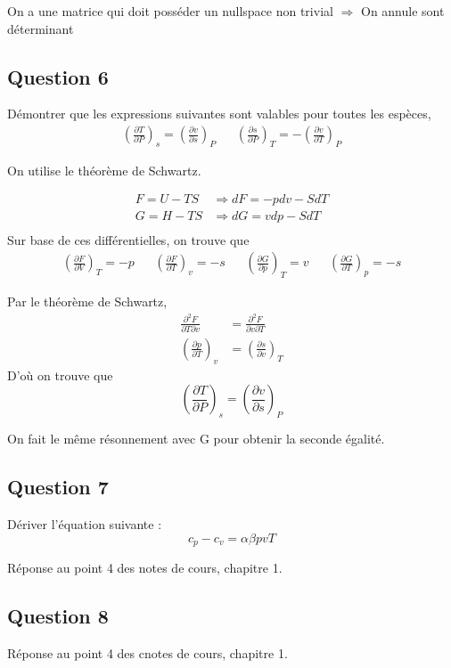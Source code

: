 \begin{tcolorbox}
    On a une matrice qui doit posséder un nullspace non trivial $\Rightarrow$ On annule sont déterminant
\end{tcolorbox}


\subsection*{Question 6}
Démontrer que les expressions suivantes sont valables pour toutes les espèces,
\begin{align*}
    \left(\frac{\partial T}{\partial P}\right)_s = \left(\frac{\partial v}{\partial s}\right)_P & & \left(\frac{\partial s}{\partial P}\right)_T = -\left(\frac{\partial v}{\partial T}\right)_P
\end{align*}

\begin{tcolorbox}
    On utilise le théorème de Schwartz.

    \begin{align*}
        F = U - TS & \Rightarrow dF = -pdv - SdT\\
        G = H - TS & \Rightarrow dG = vdp - SdT\\
    \end{align*}
    Sur base de ces différentielles, on trouve que 
    \begin{align*}
        \left( \frac{\partial F}{\partial V}\right)_T = -p & & \left( \frac{\partial F}{\partial T}\right)_v = -s & & \left( \frac{\partial G}{\partial p}\right)_T = v & & \left( \frac{\partial G}{\partial T}\right)_p = -s
    \end{align*}

    Par le théorème de Schwartz, 
    \begin{align*}
        \frac{\partial^2 F }{\partial T \partial v} &= \frac{\partial^2 F }{\partial v \partial T}\\
        \left( \frac{\partial p}{\partial T}\right)_v &= \left( \frac{\partial s}{\partial v}\right)_T
    \end{align*}
    D'où on trouve que 
    \begin{equation*}
        \left(\frac{\partial T}{\partial P}\right)_s = \left(\frac{\partial v}{\partial s}\right)_P
    \end{equation*}

    On fait le même résonnement avec G pour obtenir la seconde égalité.
\end{tcolorbox}


\subsection*{Question 7}
Dériver l'équation suivante : 
\begin{equation*}
    c_p - c_v = \alpha \beta p v T
\end{equation*}

\begin{tcolorbox}
    Réponse au point 4 des notes de cours, chapitre 1.
\end{tcolorbox}

\subsection*{Question 8}

\begin{tcolorbox}
    Réponse au point 4 des cnotes de cours, chapitre 1.
\end{tcolorbox}